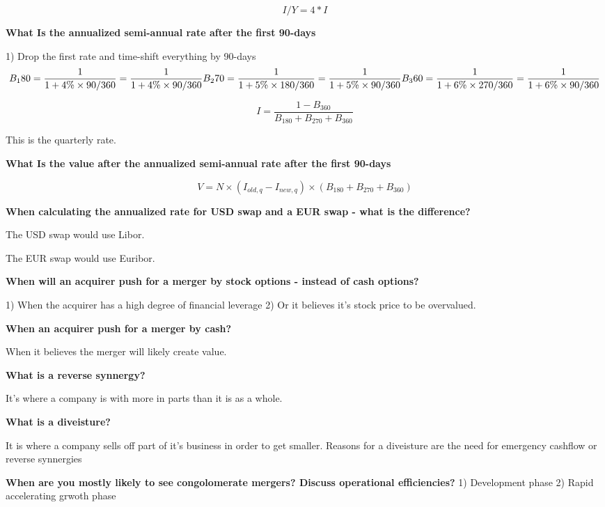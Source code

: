 \documentclass[12pt]{article}
\begin{document}
\begin{framed}
\begin{framed}
	$$
	I/Y = 4 * I
	$$
	
	\textbf{What Is the annualized semi-annual rate after the first 90-days}

		1) Drop the first rate and time-shift everything by 90-days
		$$
		B_180 = \dfrac{1}{1 + 4\% \times 90/360} = \dfrac{1}{1 + 4\% \times 90/360} \\
		B_270 = \dfrac{1}{1 + 5\% \times 180/360} = \dfrac{1}{1 + 5\% \times 90/360} \\
		B_360 = \dfrac{1}{1 + 6\% \times 270/360} = \dfrac{1}{1 + 6\% \times 90/360} \\
		$$
		
		$$
		I = \dfrac{1 - B_360}{B_180 + B_270 + B_360}
		$$

		This is the quarterly rate.
	
		\textbf{What Is the value after the annualized semi-annual rate after the first 90-days}
		
		$$
		V = N \times (I_{old,q} - I_{new,q}) \times (B_180 + B_270 + B_360)
		$$
		
	
	\end{framed}
	
	\textbf{When calculating the annualized rate for USD swap and a EUR swap - what is the difference?}
	
	The USD swap would use Libor. 
	
	The EUR swap would use Euribor.
	
	

	\textbf{When will an acquirer push for a merger by stock options - instead of cash options?}
	
	1) When the acquirer has a high degree of financial leverage
	2) Or it believes it's stock price to be overvalued. 	
	
	\textbf{When an acquirer push for a merger by cash?}
	
	When it believes the merger will likely create value. 
	
	\textbf{What is a reverse synnergy?}
	
	It's where a company is with more in parts than it is as a whole. 
	
	\textbf{What is a diveisture?}
	
	It is where a company sells off part of it's business in order to get smaller. Reasons for a diveisture are the need for emergency cashflow or reverse synnergies
	
	\textbf{When are you mostly likely to see congolomerate mergers? Discuss operational efficiencies?}
	1) Development phase
	2) Rapid accelerating grwoth phase
	

\end{framed}
\end{document}
